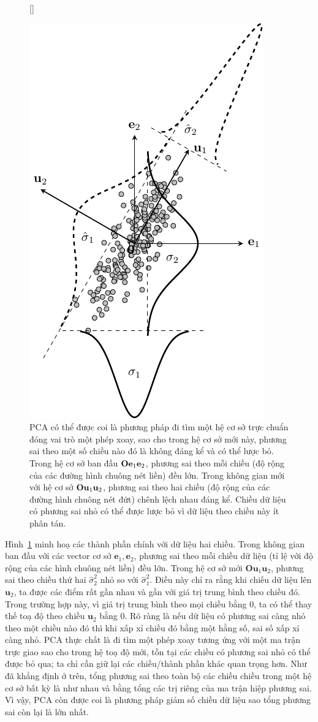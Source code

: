 \begin{figure}[t]


[\FBwidth]
{\caption{ PCA có thể được coi là phương pháp đi tìm một hệ cơ sở trực chuẩn
đóng vai trò một phép xoay, sao cho trong hệ cơ sở mới này, phương sai theo
một số chiều nào đó là không đáng kể và có thể lược bỏ. Trong hệ cơ sở ban đầu
$\mathbf{O}\mathbf{e}_1\mathbf{e}_2$, phương sai theo mỗi chiều (độ rộng của các đường
hình chuông nét liền) đều lớn. Trong không gian mới với hệ cơ sở
$\mathbf{O}\mathbf{u}_1\mathbf{u}_2$, phương sai theo hai chiều (độ rộng của các đường
hình chuông nét đứt) chênh lệch nhau đáng kể. Chiều dữ liệu có phương sai nhỏ
có thể được lược bỏ vì dữ liệu theo chiều này ít phân tán. }
\label{fig:27_4}}
{ %

\includegraphics[width=.4\textwidth]{Chapters/07_DimemsionalityReduction/27_pca/latex/pca_var.pdf}
}
\end{figure}
Hình~\ref{fig:27_4} minh hoạ các thành phần chính với dữ liệu hai chiều.
Trong không gian ban đầu với các vector cơ sở $\mathbf{e}_1,
\mathbf{e}_2$, phương sai theo mỗi chiều dữ liệu (tỉ lệ với độ rộng của các hình chuông
nét liền) đều lớn. Trong hệ cơ sở mới $\mathbf{O}\mathbf{u}_1\mathbf{u}_2$,
phương sai theo chiều thứ hai $\hat{\sigma}_2^2$ nhỏ so với
$\hat{\sigma}_1^2$. Điều này chỉ ra rằng khi chiếu dữ liệu lên $\mathbf{u}_2$, ta
được các điểm rất gần nhau và gần với giá trị trung bình theo chiều đó. Trong
trường hợp này, vì giá trị trung bình theo mọi chiều bằng 0, ta có thể thay thế
toạ độ theo chiều $\mathbf{u}_2$ bằng 0. Rõ ràng là nếu dữ liệu có phương sai
càng nhỏ theo một chiều nào đó thì khi xấp xỉ chiều đó bằng một hằng số, sai số
xấp xỉ càng nhỏ. PCA thực chất là đi tìm một phép xoay tương ứng với một ma trận
trực giao sao cho trong hệ toạ độ mới, tồn tại các chiều có phương sai nhỏ
có thể được bỏ qua; ta chỉ cần giữ lại các chiều/thành phần khác quan trọng hơn. Như
đã khẳng định ở trên, tổng phương sai theo toàn bộ các chiều chiều trong một hệ cơ sở bất kỳ là
như nhau và bằng tổng các trị riêng của ma trận hiệp phương sai. Vì vậy, PCA còn
được coi là phương pháp giảm số chiều dữ liệu sao tổng phương sai còn lại là lớn
nhất.


